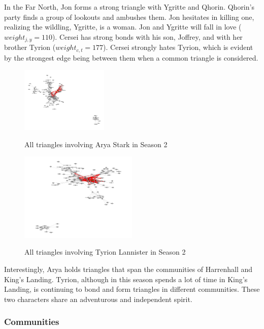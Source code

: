 \documentclass[10pt,twocolumn,letterpaper]{article}
\begin{document}
\newpage

In the Far North, Jon forms a strong triangle with Ygritte and Qhorin. Qhorin's party finds a group of lookouts and ambushes them. Jon hesitates in killing one, realizing the wildling, Ygritte, is a woman. Jon and Ygritte will fall in love ($weight_{j,y}=110$). 
Cersei has strong bonds with his son, Joffrey, and with her brother Tyrion ($weight_{c,t}=177$). Cersei strongly hates Tyrion, which is evident by the strongest edge being between them when a common triangle is considered.

\begin{figure}[!h]
    \centering
    \includegraphics[width=0.37\textwidth]{img/s2/triangles_arya.jpg} \\
    \caption{\small{All triangles involving Arya Stark in Season 2}}
\end{figure}

\begin{figure}[!h]
    \centering
    \includegraphics[width=0.5\textwidth]{img/s2/triangles_tyrion.jpg} \\
    \caption{\small{All triangles involving Tyrion Lannister in Season 2}}
\end{figure}

Interestingly, Arya holds triangles that span the communities of Harrenhall and King's Landing. Tyrion, although in this season spends a lot of time in King's Landing, is continuing to bond and form triangles in different communities. These two characters share an adventurous and independent spirit.


\subsubsection{Communities}
\end{document}
